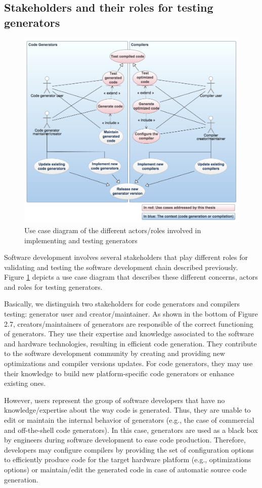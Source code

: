 \subsection{Stakeholders and their roles for testing generators}
\begin{figure}[h]
	\center
	\includegraphics[scale=0.45]{Background/fig/usecase}
	\caption{Use case diagram of the different actors/roles involved in implementing and testing generators}
	\label{fig:usecase}
\end{figure}
Software development involves several stakeholders that play different roles for validating and testing the software development chain described previously.
Figure \ref{fig:usecase} depicts a use case diagram that describes these different concerns, actors and roles for testing generators.

Basically, we distinguish two stakeholders for code generators and compilers testing: generator user and creator/maintainer. As shown in the bottom of Figure 2.7, creators/maintainers of generators are responsible of the correct functioning of generators. They use their expertise and knowledge associated to the software and hardware technologies, resulting in efficient code generation. They contribute to the software development community by creating and providing new optimizations and compiler versions updates. For code generators, they may use their knowledge to build new platform-specific code generators or enhance existing ones. 

However, users represent the group of software developers that have no knowledge/expertise about the way code is generated. Thus, they are unable to edit or maintain the internal behavior of generators (e.g., the case of commercial and off-the-shell code generators). In this case, generators are used as a black box by engineers during software development to ease code production. Therefore, developers may configure compilers by providing the set of configuration options to efficiently produce code for the target hardware platform (e.g., optimizations options) or maintain/edit the generated code in case of automatic source code generation.

